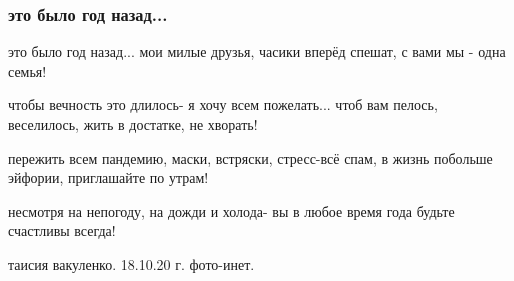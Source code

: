  
 
 

\subsubsection{это было год назад...}

это было год назад...
мои милые друзья,
часики вперёд спешат,
с вами мы - одна семья!

чтобы вечность это длилось-
я хочу всем пожелать...
чтоб вам пелось, веселилось,
жить в достатке, не хворать!

пережить всем пандемию,
маски, встряски, стресс-всё спам,
в жизнь побольше эйфории,
приглашайте  по утрам!

несмотря на непогоду,
на дожди и холода-
вы в любое время года
будьте счастливы всегда!

таисия вакуленко.
18.10.20 г.
фото-инет.
